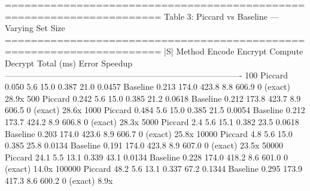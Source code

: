 ======================================================================
  Table 3: Piccard vs Baseline — Varying Set Size
======================================================================
     |S|    Method  Encode  Encrypt  Compute  Decrypt  Total (ms)      Error  Speedup
-------------------------------------------------------------------------------------
     100   Piccard   0.050      5.6     15.0    0.387        21.0     0.0457         
          Baseline   0.213    174.0    423.8      8.8       606.9  0 (exact)    28.9x
     500   Piccard   0.242      5.6     15.0    0.385        21.2     0.0618         
          Baseline   0.212    173.8    423.7      8.9       606.5  0 (exact)    28.6x
    1000   Piccard   0.484      5.6     15.0    0.385        21.5     0.0054         
          Baseline   0.212    173.7    424.2      8.9       606.8  0 (exact)    28.3x
    5000   Piccard     2.4      5.6     15.1    0.382        23.5     0.0618         
          Baseline   0.203    174.0    423.6      8.9       606.7  0 (exact)    25.8x
   10000   Piccard     4.8      5.6     15.0    0.385        25.8     0.0134         
          Baseline   0.191    174.0    423.8      8.9       607.0  0 (exact)    23.5x
   50000   Piccard    24.1      5.5     13.1    0.339        43.1     0.0134         
          Baseline   0.228    174.0    418.2      8.6       601.0  0 (exact)    14.0x
  100000   Piccard    48.2      5.6     13.1    0.337        67.2     0.1344         
          Baseline   0.295    173.9    417.3      8.6       600.2  0 (exact)     8.9x

